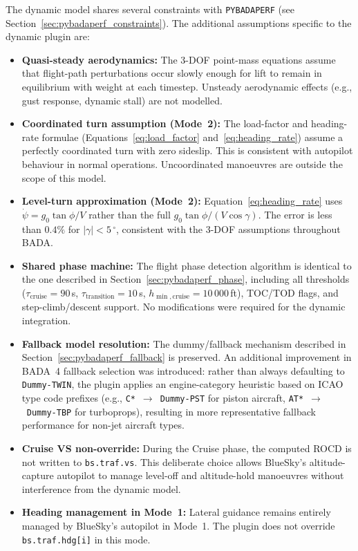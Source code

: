 The dynamic model shares several constraints with \texttt{PYBADAPERF} (see Section~\ref{sec:pybadaperf_constraints}).  The additional assumptions specific to the dynamic plugin are:

\begin{itemize}
    \item \textbf{Quasi-steady aerodynamics:} The 3-DOF point-mass equations assume that flight-path perturbations occur slowly enough for lift to remain in equilibrium with weight at each timestep.  Unsteady aerodynamic effects (e.g., gust response, dynamic stall) are not modelled.

    \item \textbf{Coordinated turn assumption (Mode~2):} The load-factor and heading-rate formulae (Equations~\ref{eq:load_factor} and~\ref{eq:heading_rate}) assume a perfectly coordinated turn with zero sideslip.  This is consistent with autopilot behaviour in normal operations.  Uncoordinated manoeuvres are outside the scope of this model.

    \item \textbf{Level-turn approximation (Mode~2):} Equation~\ref{eq:heading_rate} uses $\dot\psi = g_0\tan\phi/V$ rather than the full $g_0\tan\phi/(V\cos\gamma)$.  The error is less than $0.4\%$ for $|\gamma| < 5$\,$^\circ$, consistent with the 3-DOF assumptions throughout BADA.

    \item \textbf{Shared phase machine:} The flight phase detection algorithm is identical to the one described in Section~\ref{sec:pybadaperf_phase}, including all thresholds ($\tau_{\text{cruise}} = 90$\,s, $\tau_{\text{transition}} = 10$\,s, $h_{\min,\text{cruise}} = 10\,000$\,ft), TOC/TOD flags, and step-climb/descent support.  No modifications were required for the dynamic integration.

    \item \textbf{Fallback model resolution:} The dummy/fallback mechanism described in Section~\ref{sec:pybadaperf_fallback} is preserved.  An additional improvement in BADA~4 fallback selection was introduced: rather than always defaulting to \texttt{Dummy-TWIN}, the plugin applies an engine-category heuristic based on ICAO type code prefixes (e.g., \texttt{C*}~$\rightarrow$~\texttt{Dummy-PST} for piston aircraft, \texttt{AT*}~$\rightarrow$~\texttt{Dummy-TBP} for turboprops), resulting in more representative fallback performance for non-jet aircraft types.

    \item \textbf{Cruise VS non-override:} During the Cruise phase, the computed ROCD is not written to \texttt{bs.traf.vs}.  This deliberate choice allows BlueSky's altitude-capture autopilot to manage level-off and altitude-hold manoeuvres without interference from the dynamic model.

    \item \textbf{Heading management in Mode~1:} Lateral guidance remains entirely managed by BlueSky's autopilot in Mode~1.  The plugin does not override \texttt{bs.traf.hdg[i]} in this mode.
\end{itemize}

